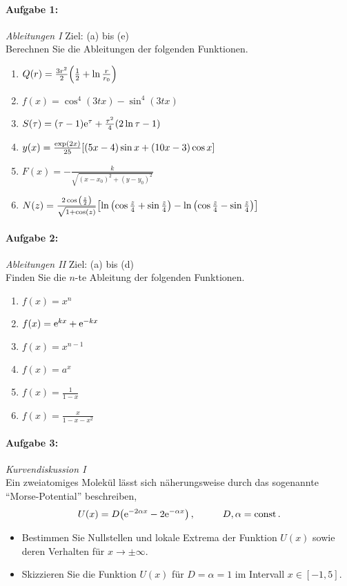 
\paragraph{Aufgabe 1: } \emph{Ableitungen I} \hfill Ziel: (a) bis (e)\\[0.2cm]
Berechnen Sie die Ableitungen der folgenden Funktionen.
\begin{enumerate}[label=(\alph*)]
    \item $Q(r)=\frac{3r^2}{2}\qty(\frac{1}{2}+\ln\frac{r}{r_0})$
    \item $f(x)=\cos^4(3tx)-\sin^4(3tx)$
    \item $S(\tau)=(\tau-1)\mathrm{e}^{\tau}+\frac{\tau^2}{4}\qty(2\ln\tau-1)$
    \item $y(x)=\frac{\exp(2x)}{25}\qty[(5x-4)\sin x+(10x-3)\cos x]$
    \item $F(x)=-\frac{k}{\sqrt{(x-x_0)^2+(y-y_0)^2}}$
    \item $N(z)=\frac{2\cos\qty(\frac{z}{2})}{\sqrt{1+\cos(z)}}\qty[\ln\qty(\cos\frac{z}{4}+\sin\frac{z}{4})-\ln\qty(\cos\frac{z}{4}-\sin\frac{z}{4})]$
\end{enumerate}
%
\paragraph{Aufgabe 2: } \emph{Ableitungen II} \hfill Ziel: (a) bis (d)\\[0.2cm]
Finden Sie die $n$-te Ableitung der folgenden Funktionen.
\begin{multicols}{2}
    \begin{enumerate}[label=(\alph*)]
        \item $f(x)=x^n$
        \item $f(x)=\mathrm{e}^{kx}+\mathrm{e}^{-kx}$
        \item $f(x)=x^{n-1}$
        \item $f(x)=a^x$ 
        \item $f(x)=\frac{1}{1-x}$
        \item $f(x)=\frac{x}{1-x-x^2}$ 
    \end{enumerate} 
\end{multicols}
%
\paragraph{Aufgabe 3: } \emph{Kurvendiskussion I}\\[0.2cm]
Ein zweiatomiges Molekül lässt sich näherungsweise durch das sogenannte ``Morse-Potential'' beschreiben,
\begin{align*}
U(x)=D\qty(\mathrm{e}^{-2\alpha x}-2\mathrm{e}^{-\alpha x})\,, \hspace{1cm} D,\alpha=\operatorname{const}.
\end{align*}
\begin{itemize}
\item Bestimmen Sie Nullstellen und lokale Extrema der Funktion $U(x)$ sowie deren Verhalten für $x \to\pm\infty$.
\item Skizzieren Sie die Funktion $U(x)$ für $D=\alpha=1$ im Intervall $x\in[-1,5]$.
\end{itemize}
%
